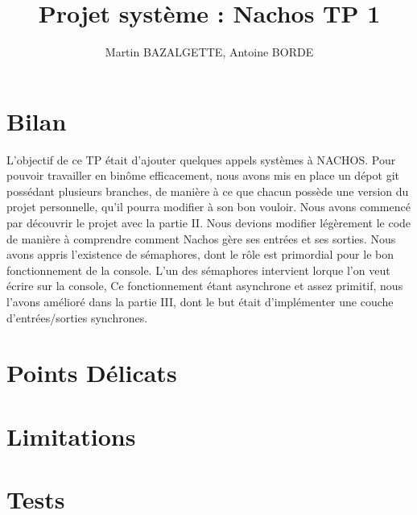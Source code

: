 \documentclass[12pt]{article}
\begin{document}
\title{Projet système : Nachos TP 1}
\author{Martin BAZALGETTE, Antoine BORDE}

\maketitle
\newpage
\tableofcontents
\newpage

\section{Bilan}
L'objectif de ce TP était d'ajouter quelques appels systèmes à NACHOS.
\newline
Pour pouvoir travailler en binôme efficacement, nous avons mis en place un dépot git possédant plusieurs branches, de manière à ce que chacun possède une version du projet personnelle, qu'il pourra modifier à son bon vouloir.
\newline
Nous avons commencé par découvrir le projet avec la partie II. Nous devions modifier légèrement le code de manière à comprendre comment Nachos gère ses entrées et ses sorties.
Nous avons appris l'existence de sémaphores, dont le rôle est primordial pour le bon fonctionnement de la console.
L'un des sémaphores intervient lorque l'on veut écrire sur la console, 
Ce fonctionnement étant asynchrone et assez primitif, nous l'avons amélioré dans la partie III, dont le but était d'implémenter une couche d'entrées/sorties synchrones.

\section {Points Délicats}


\section {Limitations}


\section {Tests}
\end{document}
